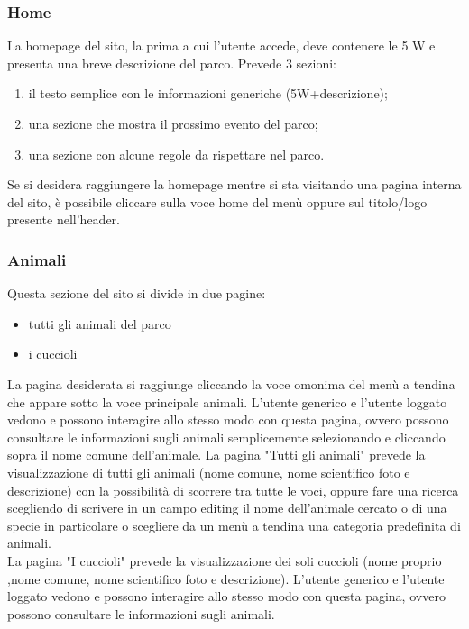         \subsubsection{Home}
            La homepage del sito, la prima a cui l'utente accede, deve contenere le 5 W e presenta una breve descrizione del parco.
            Prevede 3 sezioni:
            \begin{enumerate}
                \item il testo semplice con le informazioni generiche (5W+descrizione);
                \item una sezione che mostra il prossimo evento del parco;
                \item una sezione con alcune regole da rispettare nel parco.
            \end{enumerate}
            Se si desidera raggiungere la homepage mentre si sta visitando una pagina interna del sito, è possibile cliccare sulla voce home del menù oppure sul titolo/logo presente nell'header.

        \subsubsection{Animali}
            Questa sezione del sito si divide in due pagine:
            \begin{itemize}
                \item tutti gli animali del parco
                \item i cuccioli
            \end{itemize}
            La pagina desiderata si raggiunge cliccando la voce omonima del menù a tendina che appare sotto la voce principale animali. L'utente generico e l'utente loggato vedono e possono interagire allo stesso modo con questa pagina, ovvero possono consultare le informazioni sugli animali semplicemente selezionando e cliccando sopra il nome comune dell'animale.
            La pagina "Tutti gli animali" prevede la visualizzazione di tutti gli animali (nome comune, nome scientifico foto e descrizione) con la possibilità di scorrere tra tutte le voci, oppure fare una ricerca scegliendo di scrivere in un campo editing il nome dell'animale cercato o di una specie in particolare o scegliere da un menù a tendina una categoria predefinita di animali. \\
            La pagina "I cuccioli" prevede la visualizzazione dei soli cuccioli (nome proprio ,nome comune, nome scientifico foto e descrizione). L'utente generico e l'utente loggato vedono e possono interagire allo stesso modo con questa pagina, ovvero possono consultare le informazioni sugli animali.

